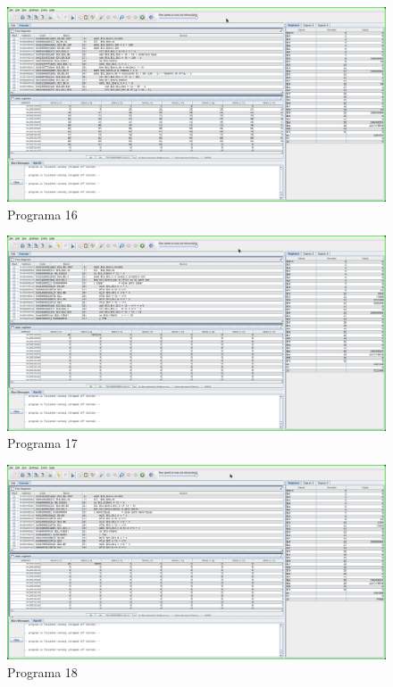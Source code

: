 \documentclass[a4paper,11pt,fleqn]{article}
\begin{document}
\begin{figure}[!ht]
    \caption{Programa 16}
    \centering
    \includegraphics[width=1\textwidth]{programa16}
\end{figure}

\begin{figure}[!ht]
    \caption{Programa 17}
    \centering
    \includegraphics[width=1\textwidth]{programa17}
\end{figure}

\begin{figure}[!ht]
    \caption{Programa 18}
    \centering
    \includegraphics[width=1\textwidth]{programa18}
\end{figure}
\end{document}
